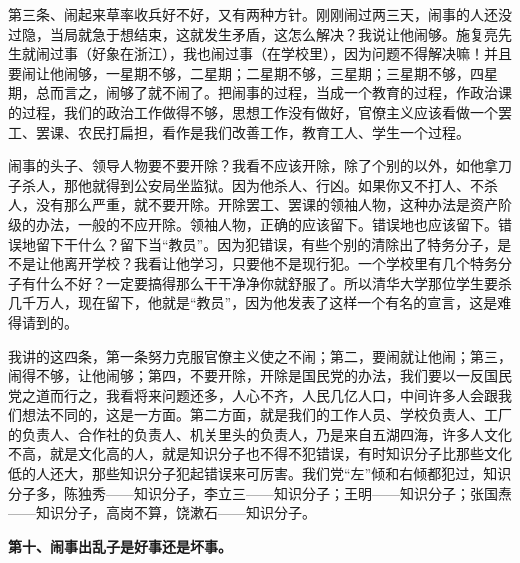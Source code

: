 第三条、闹起来草率收兵好不好，又有两种方针。刚刚闹过两三天，闹事的人还没过隐，当局就急于想结束，这就发生矛盾，这怎么解决？我说让他闹够。施复亮先生就闹过事（好象在浙江），我也闹过事（在学校里），因为问题不得解决嘛！并且要闹让他闹够，一星期不够，二星期；二星期不够，三星期；三星期不够，四星期，总而言之，闹够了就不闹了。把闹事的过程，当成一个教育的过程，作政治课的过程，我们的政治工作做得不够，思想工作没有做好，官僚主义应该看做一个罢工、罢课、农民打扁担，看作是我们改善工作，教育工人、学生一个过程。

闹事的头子、领导人物要不要开除？我看不应该开除，除了个别的以外，如他拿刀子杀人，那他就得到公安局坐监狱。因为他杀人、行凶。如果你又不打人、不杀人，没有那么严重，就不要开除。开除罢工、罢课的领袖人物，这种办法是资产阶级的办法，一般的不应开除。领袖人物，正确的应该留下。错误地也应该留下。错误地留下干什么？留下当“教员”。因为犯错误，有些个别的清除出了特务分子，是不是让他离开学校？我看让他学习，只要他不是现行犯。一个学校里有几个特务分子有什么不好？一定要搞得那么干干净净你就舒服了。所以清华大学那位学生要杀几千万人，现在留下，他就是“教员”，因为他发表了这样一个有名的宣言，这是难得请到的。

我讲的这四条，第一条努力克服官僚主义使之不闹；第二，要闹就让他闹；第三，闹得不够，让他闹够；第四，不要开除，开除是国民党的办法，我们要以一反国民党之道而行之，我看将来问题还多，人心不齐，人民几亿人口，中间许多人会跟我们想法不同的，这是一方面。第二方面，就是我们的工作人员、学校负责人、工厂的负责人、合作社的负责人、机关里头的负责人，乃是来自五湖四海，许多人文化不高，就是文化高的人，就是知识分子也不得不犯错误，有时知识分子比那些文化低的人还大，那些知识分子犯起错误来可厉害。我们党“左”倾和右倾都犯过，知识分子多，陈独秀——知识分子，李立三——知识分子；王明——知识分子；张国焘——知识分子，高岗不算，饶漱石——知识分子。

\textbf{第十、闹事出乱子是好事还是坏事。}

